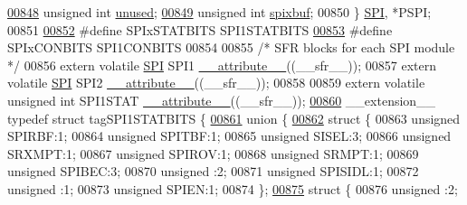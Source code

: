 \begin{DoxyCode}
\hypertarget{a00009_source_l00848}{}\hyperlink{a00008_a1902ff28c01f8dab73ffed44a642ae6a}{00848}         \textcolor{keywordtype}{unsigned} \textcolor{keywordtype}{int} \hyperlink{a00008_a1902ff28c01f8dab73ffed44a642ae6a}{unused};
\hypertarget{a00009_source_l00849}{}\hyperlink{a00008_a5fa797701de92c992d6451c5817a47bd}{00849}         \textcolor{keywordtype}{unsigned} \textcolor{keywordtype}{int} \hyperlink{a00008_a5fa797701de92c992d6451c5817a47bd}{spixbuf};
00850 \} \hyperlink{a00008_d3/d95/a00757}{SPI}, *PSPI;
00851 
\hypertarget{a00009_source_l00852}{}\hyperlink{a00009_a46ce444944af8254e23b8c6a38724609}{00852} \textcolor{preprocessor}{#define SPIxSTATBITS SPI1STATBITS}
\hypertarget{a00009_source_l00853}{}\hyperlink{a00009_ae4ad205f800eddb30bcc3f27d423f002}{00853} \textcolor{preprocessor}{#define SPIxCONBITS SPI1CONBITS}
00854 
00855 \textcolor{comment}{/* SFR blocks for each SPI module */}
00856 \textcolor{keyword}{extern} \textcolor{keyword}{volatile} \hyperlink{a00008_d3/d95/a00757}{SPI} SPI1 \hyperlink{a00009_a493c46f03454991ccc5aa7a6e1dfb2a7}{\_\_attribute\_\_}((\_\_sfr\_\_));
00857 \textcolor{keyword}{extern} \textcolor{keyword}{volatile} \hyperlink{a00008_d3/d95/a00757}{SPI} SPI2 \hyperlink{a00009_a493c46f03454991ccc5aa7a6e1dfb2a7}{\_\_attribute\_\_}((\_\_sfr\_\_));
00858 
00859 \textcolor{keyword}{extern} \textcolor{keyword}{volatile} \textcolor{keywordtype}{unsigned} \textcolor{keywordtype}{int}  SPI1STAT \hyperlink{a00009_a493c46f03454991ccc5aa7a6e1dfb2a7}{\_\_attribute\_\_}((\_\_sfr\_\_));
\hypertarget{a00009_source_l00860}{}\hyperlink{a00008}{00860} \_\_extension\_\_ \textcolor{keyword}{typedef} \textcolor{keyword}{struct }tagSPI1STATBITS \{
\hypertarget{a00009_source_l00861}{}\hyperlink{a00009}{00861}   \textcolor{keyword}{union }\{
\hypertarget{a00009_source_l00862}{}\hyperlink{a00009}{00862}     \textcolor{keyword}{struct }\{
00863       \textcolor{keywordtype}{unsigned} SPIRBF:1;
00864       \textcolor{keywordtype}{unsigned} SPITBF:1;
00865       \textcolor{keywordtype}{unsigned} SISEL:3;
00866       \textcolor{keywordtype}{unsigned} SRXMPT:1;
00867       \textcolor{keywordtype}{unsigned} SPIROV:1;
00868       \textcolor{keywordtype}{unsigned} SRMPT:1;
00869       \textcolor{keywordtype}{unsigned} SPIBEC:3;
00870       \textcolor{keywordtype}{unsigned} :2;
00871       \textcolor{keywordtype}{unsigned} SPISIDL:1;
00872       \textcolor{keywordtype}{unsigned} :1;
00873       \textcolor{keywordtype}{unsigned} SPIEN:1;
00874     \};
\hypertarget{a00009_source_l00875}{}\hyperlink{a00009}{00875}     \textcolor{keyword}{struct }\{
00876       \textcolor{keywordtype}{unsigned} :2;

\end{DoxyCode}
